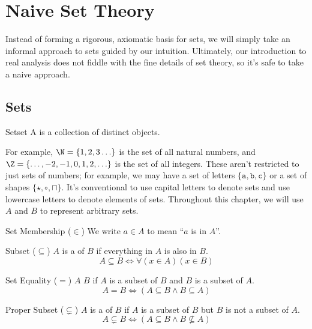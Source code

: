 \chapter{Naive Set Theory}
Instead of forming a rigorous, axiomatic basis for sets, we will simply take an informal approach to sets guided by our intuition. Ultimately, our introduction to real analysis does not fiddle with the fine details of set theory, so it's safe to take a naive approach.

\section{Sets}

\begin{dfnbox}{Set}{set}
    A  is a collection of distinct objects.
\end{dfnbox}

For example, $\N = \{1,2,3\ldots\}$ is the set of all natural numbers, and $\Z = \{ \ldots, -2, -1, 0, 1, 2, \ldots\}$ is the set of all integers. These aren't restricted to just sets of numbers; for example, we may have a set of letters $\{ \texttt{a}, \texttt{b}, \texttt{c} \} $ or a set of shapes $\{ \star, \circ, \sqcap \}$. It's conventional to use capital letters to denote sets and use lowercase letters to denote elements of sets. Throughout this chapter, we will use $A$ and $B$ to represent arbitrary sets.

\begin{dfnbox}{Set Membership ($\in$)}{}
    We write $a \in A$ to mean ``$a$ is in $A$''.
\end{dfnbox}

\begin{dfnbox}{Subset ($\subseteq$)}{}
    $A$ is a  of $B$ if everything in $A$ is also in $B$.
    \tcblower
    \[ A \subseteq B \iff \forall(x \in A)(x \in B) \]
\end{dfnbox}

\begin{dfnbox}{Set Equality ($=$)}{}
    $A$  $B$ if $A$ is a subset of $B$ and $B$ is a subset of $A$.
    \tcblower
    \[ A = B \iff (A \subseteq B \land B \subseteq A) \]
\end{dfnbox}

\begin{dfnbox}{Proper Subset ($\subsetneq$)}{}
    $A$ is a  of $B$ if $A$ is a subset of $B$ but $B$ is not a subset of $A$.
    \tcblower
    \[ A \subsetneq B \iff (A \subseteq B \land B \not\subseteq A) \]
\end{dfnbox}

